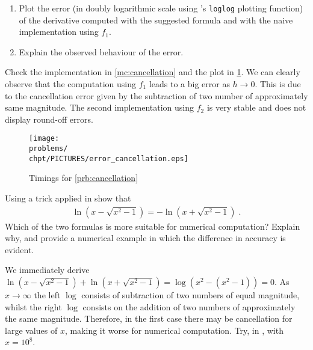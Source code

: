 \begin{problem}
\begin{subproblem}[1]
\begin{enumerate}
   \item Plot the error (in doubly logarithmic scale using \matlab's
     \texttt{loglog} plotting function) of the derivative computed with the
     suggested formula and with the naive implementation using $f_1$.
   \item Explain the observed behaviour of the error.
  \end{enumerate}
  
  \begin{solution}
   Check the \Matlab{} implementation in \cref{mc:cancellation} and the plot in \cref{fig:error_cancellation}. We can clearly observe that the computation using $f_1$ leads to a big error as $h \rightarrow 0$. This is due to the cancellation error given by the subtraction of two number of approximately same magnitude. The second implementation using $f_2$ is very stable and does not display round-off errors.
   
   

    \begin{figure}[htb]
    \centering
    \texttt{[image: \\problems/\\chpt/PICTURES/error\_cancellation.eps]}
    \caption{Timings for \ref{prb:cancellation}} \label{fig:error_cancellation}
    \end{figure}
  \end{solution}


 \end{subproblem}
 
 \begin{subproblem}[2]
   Using a trick applied in  show that
  \begin{gather*}
    \ln(x - \sqrt{x^2 - 1}) = - \ln( x + \sqrt{x^2 - 1})\;.
  \end{gather*}
  Which of the two formulas is more suitable for numerical computation? Explain
  why, and provide a numerical example in which the difference in accuracy is
  evident.
   
  \begin{solution}
 We immediately derive $\ln(x - \sqrt{x^2 - 1}) + \ln(x + \sqrt{x^2 - 1}) = \log(x^2 - (x^2 - 1)) = 0$. As $x \rightarrow \infty$ the left $\log$ consists of subtraction of two numbers of equal magnitude, whilst the right $\log$ consists on the addition of two numbers of approximately the same magnitude. Therefore, in the first case there may be cancellation for large values of $x$, making it worse for numerical computation. Try, in \Matlab, with $x = 10^8$.
  \end{solution}


\end{subproblem}
\end{problem}

